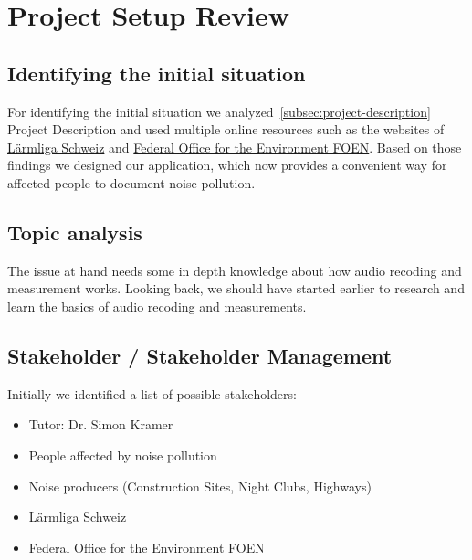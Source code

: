 \section{Project Setup Review}\label{sec:project-setup-review}

\subsection{Identifying the initial situation}\label{subsec:identifying-the-initial-situation}
For identifying the initial situation we analyzed~\ref{subsec:project-description} Project Description and used multiple online resources
such as the websites of \href{https://laermliga.ch/}{Lärmliga Schweiz} and \href{https://www.bafu.admin.ch/bafu/en/home/topics/noise/in-brief.html}{Federal Office for the Environment FOEN}.
Based on those findings we designed our application, which now provides a convenient way for affected people to document noise pollution.

\subsection{Topic analysis}\label{subsec:topic-analysis}
The issue at hand needs some in depth knowledge about how audio recoding and measurement works.
Looking back, we should have started earlier to research and learn the basics of audio recoding and measurements.

\subsection{Stakeholder / Stakeholder Management}\label{subsec:stakeholder-management}
Initially we identified a list of possible stakeholders:

\begin{itemize}
    \item Tutor: Dr. Simon Kramer
    \item People affected by noise pollution
    \item Noise producers (Construction Sites, Night Clubs, Highways)
    \item Lärmliga Schweiz
    \item Federal Office for the Environment FOEN
\end{itemize}

